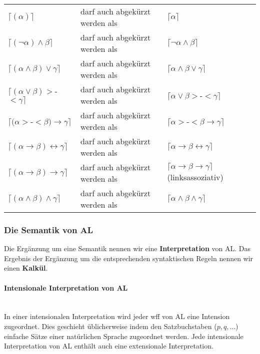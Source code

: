 \documentclass{scrartcl}
\begin{document}
\begin{tabularx}{\linewidth}{l l l}
	$ \lceil (\alpha) \rceil $ & darf auch abgekürzt werden als & $ \lceil \alpha \rceil $ \\
	$ \lceil (\neg \alpha) \wedge \beta \rceil $ & darf auch abgekürzt werden als & $ \lceil \neg \alpha \wedge \beta \rceil $ \\
	$ \lceil (\alpha \wedge \beta) \vee \gamma \rceil $ & darf auch abgekürzt werden als & $ \lceil \alpha \wedge \beta \vee \gamma \rceil $ \\
	$ \lceil (\alpha \vee \beta) >$-$< \gamma \rceil $ & darf auch abgekürzt werden als & $ \lceil \alpha \vee \beta >$-$< \gamma \rceil $ \\
	$ \lceil (\alpha >$-$< \beta) \rightarrow \gamma \rceil $ & darf auch abgekürzt werden als & $ \lceil \alpha >$-$< \beta \rightarrow \gamma \rceil $ \\
	$ \lceil (\alpha \rightarrow \beta) \leftrightarrow \gamma \rceil $ & darf auch abgekürzt werden als & $ \lceil \alpha \rightarrow \beta \leftrightarrow \gamma \rceil $ \\
	$ \lceil (\alpha \rightarrow \beta) \rightarrow \gamma \rceil $ & darf auch abgekürzt werden als & $ \lceil \alpha \rightarrow \beta \rightarrow \gamma \rceil $ (linksassoziativ) \\
	$ \lceil (\alpha \wedge \beta) \wedge \gamma \rceil $ & darf auch abgekürzt werden als & $ \lceil \alpha \wedge \beta \wedge \gamma \rceil $
\end{tabularx}

\subsubsection{Die Semantik von AL}

Die Ergänzung um eine Semantik nennen wir eine \textbf{Interpretation} von AL. Das Ergebnis der Ergänzung um die entsprechenden syntaktischen Regeln nennen wir einen \textbf{Kalkül}.

\paragraph{Intensionale Interpretation von AL} \mbox{}\\

In einer intensionalen Interpretation wird jeder wff von AL eine Intension zugeordnet. Dies geschieht üblicherweise indem den Satzbuchstaben ($ p,q,\ldots $) einfache Sätze einer natürlichen Sprache zugeordnet werden. Jede intensionale Interpretation von AL enthält auch eine extensionale Interpretation.
\end{document}
